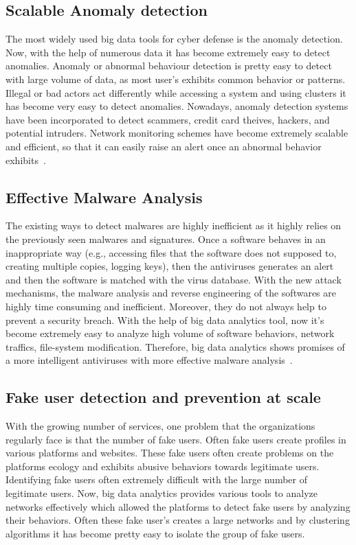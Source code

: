 \documentclass[sigconf]{acmart}
\begin{document}
\subsection{Scalable Anomaly detection}
The most widely used big data tools for cyber defense is the anomaly detection. Now, with the help of numerous data it has become extremely easy to detect anomalies. Anomaly or abnormal behaviour detection is pretty easy to detect with large volume of data, as most user's exhibits common behavior or patterns. Illegal or bad actors act differently while accessing a system and using clusters it has become very easy to detect anomalies. Nowadays, anomaly detection systems have been incorporated to detect scammers, credit card theives, hackers, and potential intruders. Network monitoring schemes have become extremely scalable and efficient, so that it can easily raise an alert once an abnormal behavior exhibits~\cite{Razar:2016,Rettig}. 

\subsection{Effective Malware Analysis}
The existing ways to detect malwares are highly inefficient as it highly relies on the previously seen malwares and signatures. Once a software behaves in an inappropriate way (e.g., accessing files that the software does not supposed to, creating multiple copies, logging keys), then the antiviruses generates an alert and then the software is matched with the virus database. With the new attack mechanisms, the malware analysis and reverse engineering of the softwares are highly time consuming and inefficient. Moreover, they do not always help to prevent a security breach. With the help of big data analytics tool, now it's become extremely easy to analyze high volume of software behaviors, network traffics, file-system modification. Therefore, big data analytics shows promises of a more intelligent antiviruses with more effective malware analysis~\cite{malware2}. 

\subsection{Fake user detection and prevention at scale}
With the growing number of services, one problem that the organizations regularly face is that the number of fake users. Often fake users create profiles in various platforms and websites. These fake users often create problems on the platforms ecology and exhibits abusive behaviors towards legitimate users. Identifying fake users often extremely difficult with the large number of legitimate users. Now, big data analytics provides various tools to analyze networks effectively which allowed the platforms to detect fake users by analyzing their behaviors. Often these fake user's creates a large networks and by clustering algorithms it has become pretty easy to isolate the group of fake users. 
\end{document}
